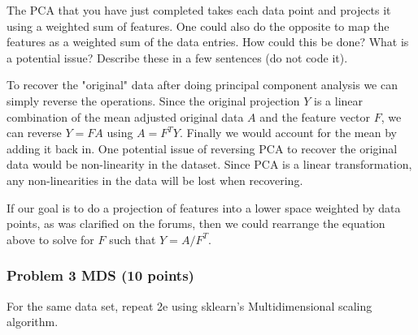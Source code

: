 \documentclass[11pt]{article}
\begin{document}
The PCA that you have just completed takes each data point and projects
it using a weighted sum of features. One could also do the opposite to
map the features as a weighted sum of the data entries. How could this
be done? What is a potential issue? Describe these in a few sentences
(do not code it).

    To recover the "original" data after doing principal component analysis
we can simply reverse the operations. Since the original projection
\(Y\) is a linear combination of the mean adjusted original data \(A\)
and the feature vector \(F\), we can reverse \(Y = FA\) using
\(A = F^TY\). Finally we would account for the mean by adding it back
in. One potential issue of reversing PCA to recover the original data
would be non-linearity in the dataset. Since PCA is a linear
transformation, any non-linearities in the data will be lost when
recovering.

If our goal is to do a projection of features into a lower space
weighted by data points, as was clarified on the forums, then we could
rearrange the equation above to solve for \(F\) such that \(Y=A/F^T\).

    \subsubsection{Problem 3 MDS (10 points)}\label{problem-3-mds-10-points}

For the same data set, repeat 2e using sklearn's Multidimensional
scaling algorithm.
\end{document}
